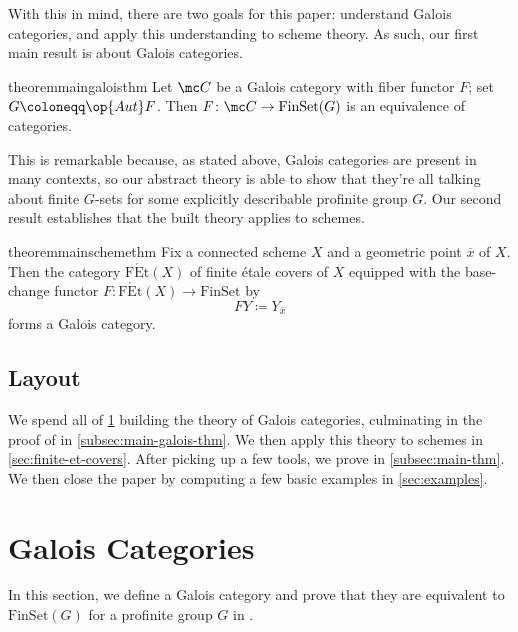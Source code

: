 \documentclass{amsart}
\begin{document}
With this in mind, there are two goals for this paper: understand Galois categories, and apply this understanding to scheme theory. As such, our first main result is about Galois categories.
\begin{restatable}{theorem}{maingaloisthm} \label{thm:main-galois-theorem}
    Let $\mc C$ be a Galois category with fiber functor $F$; set $G\coloneqq\op{Aut}F$. Then $F\colon\mc C\to\mathrm{FinSet}(G)$ is an equivalence of categories.
\end{restatable}
This is remarkable because, as stated above, Galois categories are present in many contexts, so our abstract theory is able to show that they're all talking about finite $G$-sets for some explicitly describable profinite group $G$. Our second result establishes that the built theory applies to schemes.
\begin{restatable}{theorem}{mainschemethm} \label{thm:etale-cover-galois}
    Fix a connected scheme $X$ and a geometric point $\overline x$ of $X$. Then the category $\mathrm{F\acute Et}(X)$ of finite \'etale covers of $X$ equipped with the base-change functor $F\colon\mathrm{F\acute Et}(X)\to\mathrm{FinSet}$ by
    \[FY\coloneqq Y_{\overline x}\]
    forms a Galois category.
\end{restatable}

\subsection{Layout}
We spend all of \cref{sec:galois-cat} building the theory of Galois categories, culminating in the proof of  in \cref{subsec:main-galois-thm}. We then apply this theory to schemes in \cref{sec:finite-et-covers}. After picking up a few tools, we prove  in \cref{subsec:main-thm}. We then close the paper by computing a few basic examples in \cref{sec:examples}.

\section{Galois Categories} \label{sec:galois-cat}
In this section, we define a Galois category and prove that they are equivalent to $\mathrm{FinSet}(G)$ for a profinite group $G$ in .
\end{document}
